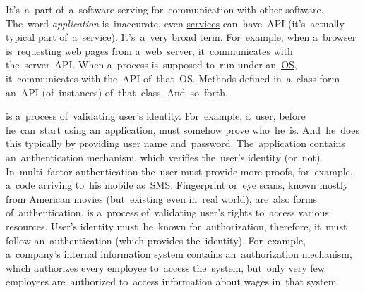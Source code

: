 \label{api}
It's~a~part of~a~software serving for~communication with other software.
The~word \textit{application} is~inaccurate, even \hyperref[applicationprocessprogramservicethread]{services} can~have~API (it's~actually typical part of~a~service).
It's~a~very broad term.
For~example, when a~browser is~requesting \hyperref[internetweb]{web} pages from a~\hyperref[webserver]{web~server}, it~communicates with the~server~API\@.
When a~process is~supposed to~run under an~\hyperref[os]{OS}, it~communicates with the~API of~that~OS\@.
Methods defined in~a~class form an~API (of~instances) of~that~class.
And~so~forth.

\label{authenticationauthorization}
\begin{itemize}
     is a~process of~validating user's identity.
            For~example, a~user, before he~can~start using an~\hyperref[applicationprocessprogramservicethread]{application}, must somehow prove who~he~is.
            And~he~does this typically by providing user name and~password.
            The~application contains an~authentication mechanism, which verifies the~user's identity (or~not).
            In~multi--factor authentication the~user must provide more proofs, for~example, a~code arriving to~his mobile as~SMS.
            Fingerprint or~eye scans, known mostly from American movies (but~existing even in~real world), are~also forms of~authentication.
     is a~process of~validating user's rights to~access various resources.
            User's identity must~be~known for~authorization, therefore, it~must follow an~authentication (which provides the~identity).
            For~example, a~company's internal information system contains an~authorization mechanism, which authorizes every employee to~access the~system, but~only very few employees are~authorized to~access information about wages in~that system.
\end{itemize}
